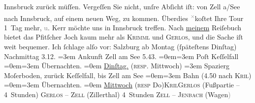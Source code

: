 \begin{ledgroupsized}[t]{13cm}
                  Innsbruck zurück müſſen. Vergeſſen Sie nicht,
               unſre Abſicht iſt: von Zell a/See nach Innsbruck, auf einem neuen Weg, zu kommen. {\pb}Überdies \substVorne{}\textsuperscript{\textcolor{gray}{×}}\substDazwischen{}k\substHinten{}oſtet Ihre Tour 1 Tag mehr, \textcolor{gray}{u}. Kerr möchte uns in Innsbruck treffen.\pend
           \pstart
           Nach \uline{meinem} Reiſebuch bietet das Pfitſcher Joch kaum mehr als \textsc{Krimml} und \textsc{Gerlos}, und die Sache iſt weit bequemer.\pend
           \pstart
           Ich ſchlage alſo vor:\pend
           \pstart
           Salzburg ab Montag (ſpäteſtens
                  Dinſtag) Nachmittag 3.12.\pend
           \leftskip=3em{}\pstart
           \noindent{}{\pb}Ankunft Zell am See{ }5.43.\pend
           \leftskip=0em{}\leftskip=3em{}\pstart
           Poſt Keſſelfall\pend
           \leftskip=0em{}\leftskip=3em{}\pstart
           Übernachten.\pend
           \leftskip=0em{}\pstart
           \noindent{}\uline{Dinſtag.} (\textsc{resp}. Mittwoch)\pend
           \leftskip=3em{}\pstart
           \noindent{}Spazierg Moſerboden, zurück Keſſelfall, bis Zell am See\pend
           \leftskip=0em{}\leftskip=3em{}\pstart
           Bahn (4.50 nach \textsc{Kri{\geminationm}l})\pend
           \leftskip=0em{}\leftskip=3em{}\pstart
           Übernachten.\pend
           \leftskip=0em{}\pstart
           \noindent{}\uline{Mittwoch}{ }\introOben{}(\textsc{resp}{ }Do{\geminationn})\introOben{}{ }\textsc{Kri{\geminationm}l}\textsc{Gerlos} (Fußpartie – 4 Stunden)\pend
           \pstart
           \textsc{Gerlos} – \textsc{Zell} (Zillerthal) 4 Stunden\pend
           \pstart
           \textsc{Zell – Jenbach} (Wagen\textcolor{gray}{)}\pend

\end{ledgroupsized}
